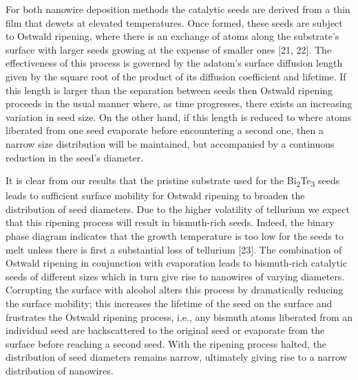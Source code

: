 For both nanowire deposition methods the catalytic
seeds are derived from a thin film that dewets at elevated
temperatures. Once formed, these seeds are subject to Ostwald
ripening, where there is an exchange of atoms along the
substrate's surface with larger seeds growing at the expense
of smaller ones [21, 22]. The effectiveness of this process is
governed by the adatom's surface diffusion length given by
the square root of the product of its diffusion coefficient and
lifetime. If this length is larger than the separation between
seeds then Ostwald ripening proceeds in the usual manner
where, as time progresses, there exists an increasing variation
in seed size. On the other hand, if this length is reduced
to where atoms liberated from one seed evaporate before
encountering a second one, then a narrow size distribution will
be maintained, but accompanied by a continuous reduction in
the seed's diameter.

It is clear from our results that the pristine substrate used
for the Bi\textsubscript{2}Te\textsubscript{3} seeds leads to sufficient surface mobility for
Ostwald ripening to broaden the distribution of seed diameters.
Due to the higher volatility of tellurium we expect that this
ripening process will result in bismuth-rich seeds. Indeed, the
binary phase diagram indicates that the growth temperature is
too low for the seeds to melt unless there is first a substantial
loss of tellurium [23]. The combination of Ostwald ripening in conjunction with evaporation leads to bismuth-rich catalytic
seeds of different sizes which in turn give rise to nanowires of
varying diameters. Corrupting the surface with alcohol alters
this process by dramatically reducing the surface mobility; this
increases the lifetime of the seed on the surface and frustrates
the Ostwald ripening process, i.e., any bismuth atoms liberated
from an individual seed are backscattered to the original seed
or evaporate from the surface before reaching a second seed.
With the ripening process halted, the distribution of seed
diameters remains narrow, ultimately giving rise to a narrow
distribution of nanowires.

